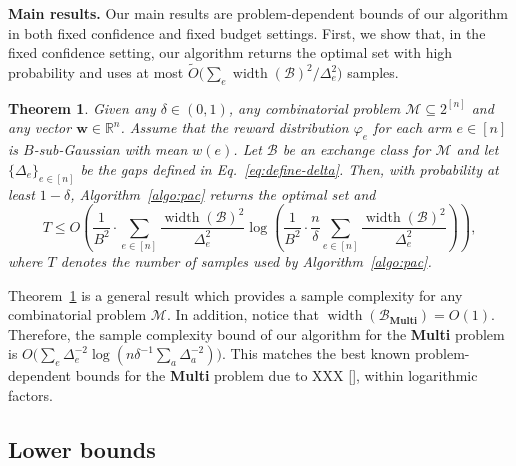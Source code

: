 \documentclass{article}
\newtheorem{theorem}{Theorem}
\newcommand{\Rew}{\varphi}
\newcommand{\M}{\mathcal M}
\newcommand{\B}{\mathcal B}
\newcommand{\RR}{\mathbb R}
\DeclareMathOperator{\rank}{width}
\newcommand{\MultiIdent}{\textbf{Multi}\xspace}
\renewcommand{\vec}[1]{\boldsymbol{#1}}
\begin{document}
\begin{spacing}{1.1}
\textbf{Main results.} 
Our main results are problem-dependent bounds of our algorithm in both fixed confidence and fixed budget settings.
First, we show that, in the fixed confidence setting, our algorithm returns the optimal set with high probability and uses at most $\tilde O\big(\sum_e \rank(\B)^2/\Delta_e^2\big)$ samples.
\begin{theorem}
Given any $\delta \in (0,1)$, any combinatorial problem $\M \subseteq 2^{[n]}$ and any vector $\vec w \in \RR^{n}$.
Assume that the reward distribution $\Rew_e$ for each arm $e\in [n]$ is  $B$-sub-Gaussian with mean $w(e)$.
Let $\B$ be an exchange class for $\M$ and let $\{\Delta_e\}_{e\in [n]}$ be the gaps defined in Eq.~\eqref{eq:define-delta}.
Then, with probability at least $1-\delta$, Algorithm~\ref{algo:pac} returns the optimal set and
$$
T \le O\left(\frac{1}{B^2}\cdot \sum_{e\in [n]} \frac{\rank(\B)^2}{\Delta_e^2} \log\left(\frac{1}{B^2}\cdot \frac{n}{\delta} \sum_{e\in[n]}\frac{\rank(\B)^2}{\Delta_e^2} \right)\right),
$$
where $T$ denotes the number of samples used by Algorithm~\ref{algo:pac}.
\label{theorem:main}
\end{theorem}
Theorem~\ref{theorem:main} is a general result which provides a sample complexity for any combinatorial problem $\M$.
In addition, notice that $\rank(\B_{\MultiIdent})=O(1)$.
Therefore, the sample complexity bound of our algorithm for the \MultiIdent problem is $O\big(\sum_e \Delta_e^{-2}\log(n\delta^{-1}\sum_{a}\Delta_a^{-2})\big)$.
This matches the best known problem-dependent bounds for the \MultiIdent problem due to XXX [], within logarithmic factors.








\subsection{Lower bounds}


\end{spacing}
\end{document}
